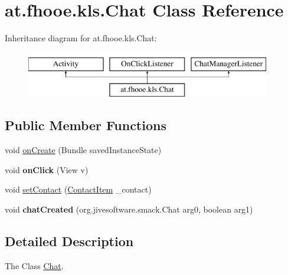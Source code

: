 \hypertarget{classat_1_1fhooe_1_1kls_1_1_chat}{\section{at.\-fhooe.\-kls.\-Chat Class Reference}
\label{classat_1_1fhooe_1_1kls_1_1_chat}
}
Inheritance diagram for at.\-fhooe.\-kls.\-Chat\-:\begin{figure}[H]
\begin{center}
\leavevmode
\includegraphics[height=2.000000cm]{classat_1_1fhooe_1_1kls_1_1_chat}
\end{center}
\end{figure}
\subsection*{Public Member Functions}
\begin{DoxyCompactItemize}
\item 
void \hyperlink{classat_1_1fhooe_1_1kls_1_1_chat_aaf2af4df6e1728f8bea9e91a94f0a58d}{on\-Create} (Bundle saved\-Instance\-State)
\item 
\hypertarget{classat_1_1fhooe_1_1kls_1_1_chat_a4a4c8761eaf6b02f6d11cbd740652790}{void {\bfseries on\-Click} (View v)}\label{classat_1_1fhooe_1_1kls_1_1_chat_a4a4c8761eaf6b02f6d11cbd740652790}

\item 
void \hyperlink{classat_1_1fhooe_1_1kls_1_1_chat_a3d1178619003e0be293d4b09d2690a28}{set\-Contact} (\hyperlink{classat_1_1fhooe_1_1kls_1_1_contact_item}{Contact\-Item} \-\_\-contact)
\item 
\hypertarget{classat_1_1fhooe_1_1kls_1_1_chat_a48ddd6ef7379dd4fc45e6f0084ec1fe2}{void {\bfseries chat\-Created} (org.\-jivesoftware.\-smack.\-Chat arg0, boolean arg1)}\label{classat_1_1fhooe_1_1kls_1_1_chat_a48ddd6ef7379dd4fc45e6f0084ec1fe2}

\end{DoxyCompactItemize}


\subsection{Detailed Description}
The Class \hyperlink{classat_1_1fhooe_1_1kls_1_1_chat}{Chat}. 

